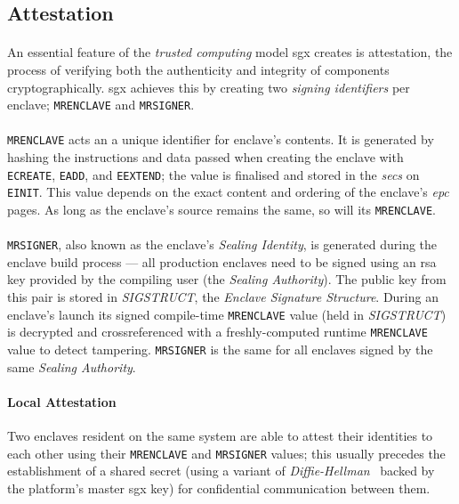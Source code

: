 \subsection{Attestation}
\label{sec:attestation}

\paragraph{} An essential feature of the \textit{trusted computing} model \acrshort{sgx} creates is attestation, the process of verifying both the authenticity and integrity of components cryptographically. \acrshort{sgx} achieves this by creating two \textit{signing identifiers} per enclave; \texttt{MRENCLAVE} and \texttt{MRSIGNER}.~\cite{Anati2013InnovativeTF,sgx-prov-service}

\paragraph{} \texttt{MRENCLAVE} acts an a unique identifier for enclave's contents. It is generated by hashing the instructions and data passed when creating the enclave with \texttt{ECREATE}, \texttt{EADD}, and \texttt{EEXTEND}; the value is finalised and stored in the \textit{\acrshort{secs}} on \texttt{EINIT}. This value depends on the exact content and ordering of the enclave's \textit{\acrshort{epc}} pages. As long as the enclave's source remains the same, so will its \texttt{MRENCLAVE}.

\paragraph{} \texttt{MRSIGNER}, also known as the enclave's \textit{Sealing Identity}, is generated during the enclave build process --- all production enclaves need to be signed using an \acrshort{rsa} key provided by the compiling user (the \textit{Sealing Authority}). The public key from this pair is stored in \textit{SIGSTRUCT}, the \textit{Enclave Signature Structure}. During an enclave's launch its signed compile-time \texttt{MRENCLAVE} value (held in \textit{SIGSTRUCT}) is decrypted and crossreferenced with a freshly-computed runtime \texttt{MRENCLAVE} value to detect tampering. \texttt{MRSIGNER} is the same for all enclaves signed by the same \textit{Sealing Authority}.

\paragraph{Local Attestation} Two enclaves resident on the same system are able to attest their identities to each other using their \texttt{MRENCLAVE} and \texttt{MRSIGNER} values; this usually precedes the establishment of a shared secret (using a variant of \textit{Diffie-Hellman}~\cite{10.1109/TIT.1976.1055638} backed by the platform's master \acrshort{sgx} key) for confidential communication between them.


